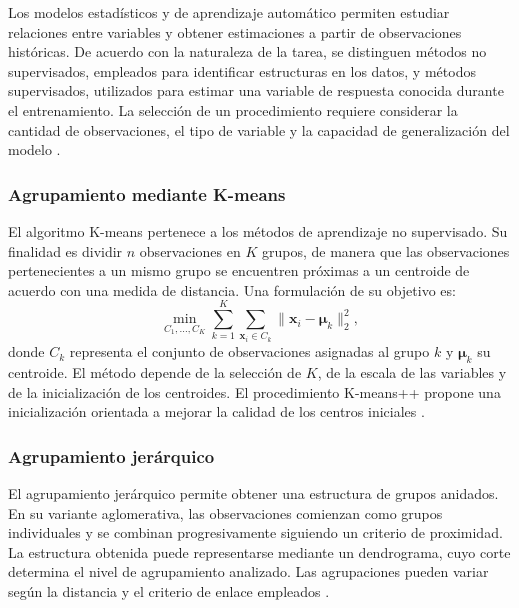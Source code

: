 Los modelos estadísticos y de aprendizaje automático permiten estudiar relaciones entre variables y obtener estimaciones a partir de observaciones históricas. De acuerdo con la naturaleza de la tarea, se distinguen métodos no supervisados, empleados para identificar estructuras en los datos, y métodos supervisados, utilizados para estimar una variable de respuesta conocida durante el entrenamiento. La selección de un procedimiento requiere considerar la cantidad de observaciones, el tipo de variable y la capacidad de generalización del modelo \cite{bishop2006pattern,hastie2009elements}.

\subsubsection{Agrupamiento mediante K-means}
El algoritmo K-means pertenece a los métodos de aprendizaje no supervisado. Su finalidad es dividir $n$ observaciones en $K$ grupos, de manera que las observaciones pertenecientes a un mismo grupo se encuentren próximas a un centroide de acuerdo con una medida de distancia. Una formulación de su objetivo es:
\begin{equation}
\underset{C_1,\ldots,C_K}{\operatorname{min}}
\sum_{k=1}^{K}\sum_{\mathbf{x}_i\in C_k}
\|\mathbf{x}_i-\boldsymbol{\mu}_k\|_2^2,
\end{equation}
donde $C_k$ representa el conjunto de observaciones asignadas al grupo $k$ y $\boldsymbol{\mu}_k$ su centroide. El método depende de la selección de $K$, de la escala de las variables y de la inicialización de los centroides. El procedimiento K-means++ propone una inicialización orientada a mejorar la calidad de los centros iniciales \cite{hastie2009elements,arthur2007kmeanspp}.

\subsubsection{Agrupamiento jerárquico}
El agrupamiento jerárquico permite obtener una estructura de grupos anidados. En su variante aglomerativa, las observaciones comienzan como grupos individuales y se combinan progresivamente siguiendo un criterio de proximidad. La estructura obtenida puede representarse mediante un dendrograma, cuyo corte determina el nivel de agrupamiento analizado. Las agrupaciones pueden variar según la distancia y el criterio de enlace empleados \cite{hastie2009elements}.

